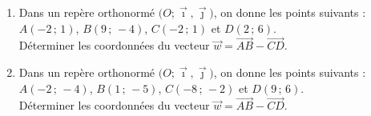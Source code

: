 \documentclass[11pt]{article}
\begin{document}
\begin{comment}
\begin{exercice}[1]

\begin{enumerate}[itemsep=1em]
\item Dans un repère orthonormé $\big(O ; \vec \imath,\vec \jmath\big)$, on donne les vecteurs suivants : $\vec{u}\begin{pmatrix}\dfrac{1}{4}\\[0.7em]\dfrac{5}{2}\end{pmatrix}$ et $\vec{v}\begin{pmatrix}\dfrac{1}{2}\\[0.7em]-3\end{pmatrix}$.\\Déterminer les coordonnées du vecteur $\overrightarrow{w}=\overrightarrow{u}-\overrightarrow{v}$.
\item Dans un repère orthonormé $\big(O ; \vec \imath,\vec \jmath\big)$, on donne les vecteurs suivants : $\vec{u}\begin{pmatrix}\dfrac{4}{3}\\[0.7em]\dfrac{4}{5}\end{pmatrix}$ et $\vec{v}\begin{pmatrix}\dfrac{5}{6}\\[0.7em]-7\end{pmatrix}$.\\Déterminer les coordonnées du vecteur $\overrightarrow{w}=\overrightarrow{u}-\overrightarrow{v}$.
\end{enumerate}
\end{exercice}
\end{comment}
\begin{exercice}[1]

\begin{enumerate}[itemsep=1em]
\item Dans un repère orthonormé $\big(O ; \vec \imath,\vec \jmath\big)$, on donne les points suivants : $A\left(-2\,;\,1\right)$, $B\left(9\,;\,-4\right)$, $C\left(-2\,;\,1\right)$ et $D\left(2\,;\,6\right)$.\\Déterminer les coordonnées du vecteur $\overrightarrow{w}=\overrightarrow{AB}-\overrightarrow{CD}$.
\item Dans un repère orthonormé $\big(O ; \vec \imath,\vec \jmath\big)$, on donne les points suivants : $A\left(-2\,;\,-4\right)$, $B\left(1\,;\,-5\right)$, $C\left(-8\,;\,-2\right)$ et $D\left(9\,;\,6\right)$.\\Déterminer les coordonnées du vecteur $\overrightarrow{w}=\overrightarrow{AB}-\overrightarrow{CD}$.
\end{enumerate}
\end{exercice}
\end{document}
